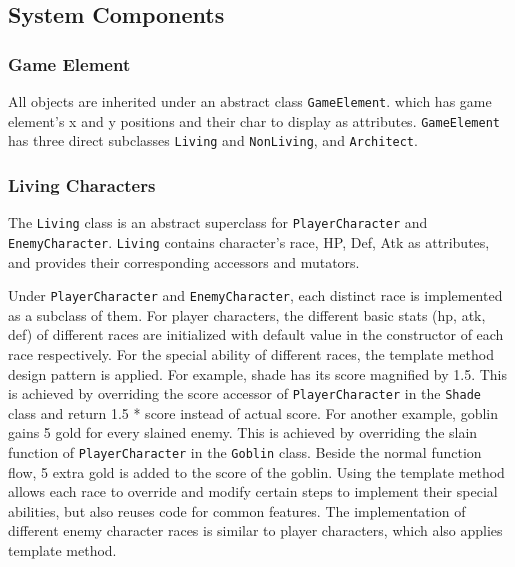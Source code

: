 \documentclass[11pt]{article}
\theoremstyle{plain} \newtheorem{theorem*}{Theorem}[subsection]
\begin{document}
\subsection{System Components}

\subsubsection{Game Element}

All objects are inherited under an abstract class \texttt{GameElement}. which
has game element's x and y positions and their char to display as attributes.
\texttt{GameElement} has three direct subclasses \texttt{Living} and
\texttt{NonLiving}, and \texttt{Architect}.


\subsubsection{Living Characters}

The \texttt{Living} class is an abstract superclass for
\texttt{PlayerCharacter} and \texttt{EnemyCharacter}.  \texttt{Living} contains
character's race, HP, Def, Atk as attributes, and provides their corresponding
accessors and mutators.

Under \texttt{PlayerCharacter} and \texttt{EnemyCharacter}, each distinct race
is implemented as a subclass of them.  For player characters, the different
basic stats (hp, atk, def) of different races are initialized with default
value in the constructor of each race respectively.  For the special ability of
different races, the template method design pattern is applied. For example,
shade has its score magnified by 1.5. This is achieved by overriding the score
accessor of \texttt{PlayerCharacter} in the \texttt{Shade} class and return 1.5
* score instead of actual score. For another example, goblin gains 5 gold for
every slained enemy. This is achieved by overriding the \textsf{slain} function
of \texttt{PlayerCharacter} in the \texttt{Goblin} class.  Beside the normal
function flow, 5 extra gold is added to the score of the goblin.  Using the
template method allows each race to override and modify certain steps to
implement their special abilities, but also reuses code for common features.
The implementation of different enemy character races is similar to player
characters, which also applies template method.
\end{document}
